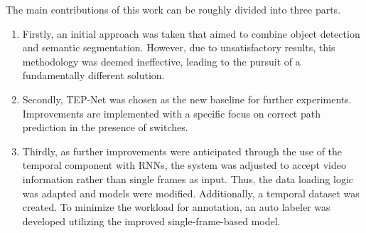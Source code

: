 \vspace{2cm} %

The main contributions of this work can be roughly divided into three parts.

\begin{enumerate}
    \item Firstly, an initial approach was taken that aimed to combine object detection and semantic segmentation.
    However, due to unsatisfactory results, this methodology was deemed ineffective, leading to the pursuit of a fundamentally different solution.
    \item Secondly, \ac{TEP}-Net \cite{tepNet2024} was chosen as the new baseline for further experiments.
    Improvements are implemented with a specific focus on correct path prediction in the presence of switches.
    \item Thirdly, as further improvements were anticipated through the use of the temporal component with \ac{RNN}s, the system was adjusted to accept video information rather than single frames as input.
    Thus, the data loading logic was adapted and models were modified.
    Additionally, a temporal dataset was created.
    To minimize the workload for annotation, an auto labeler was developed utilizing the improved single-frame-based model.
\end{enumerate}